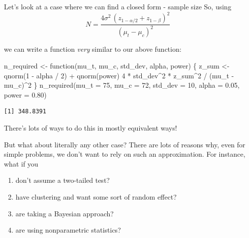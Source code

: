\documentclass[
  ignorenonframetext,
  aspectratio=169,
]{beamer}
\newenvironment{Shaded}{\begin{snugshade}}{\end{snugshade}}
\newcommand{\AttributeTok}[1]{\textcolor[rgb]{0.40,0.45,0.13}{#1}}
\newcommand{\ControlFlowTok}[1]{\textcolor[rgb]{0.00,0.23,0.31}{#1}}
\newcommand{\DecValTok}[1]{\textcolor[rgb]{0.68,0.00,0.00}{#1}}
\newcommand{\FloatTok}[1]{\textcolor[rgb]{0.68,0.00,0.00}{#1}}
\newcommand{\FunctionTok}[1]{\textcolor[rgb]{0.28,0.35,0.67}{#1}}
\newcommand{\NormalTok}[1]{\textcolor[rgb]{0.00,0.23,0.31}{#1}}
\newcommand{\OtherTok}[1]{\textcolor[rgb]{0.00,0.23,0.31}{#1}}
\newcommand{\SpecialCharTok}[1]{\textcolor[rgb]{0.37,0.37,0.37}{#1}}
\providecommand{\tightlist}{%
  \setlength{\itemsep}{0pt}\setlength{\parskip}{0pt}}\usepackage{longtable,booktabs,array}
\begin{document}
\begin{frame}[fragile]{Let's look at a case where we can find a closed
form - sample size}
\label{lets-look-at-a-case-where-we-can-find-a-closed-form---sample-size-2}
So, using \[
\boxed{N = \frac{4\sigma^2\,(z_{1-\alpha/2} + z_{1-\beta})^2}{(\mu_t - \mu_c)^2}}
\]

we can write a function \emph{very} similar to our above function:

\begin{Shaded}
\begin{Highlighting}[]
\NormalTok{n\_required }\OtherTok{\textless{}{-}} \ControlFlowTok{function}\NormalTok{(mu\_t, mu\_c, std\_dev, alpha, power) \{}
\NormalTok{  z\_sum }\OtherTok{\textless{}{-}} \FunctionTok{qnorm}\NormalTok{(}\DecValTok{1} \SpecialCharTok{{-}}\NormalTok{ alpha }\SpecialCharTok{/} \DecValTok{2}\NormalTok{) }\SpecialCharTok{+} \FunctionTok{qnorm}\NormalTok{(power)}
  \DecValTok{4} \SpecialCharTok{*}\NormalTok{ std\_dev}\SpecialCharTok{\^{}}\DecValTok{2} \SpecialCharTok{*}\NormalTok{ z\_sum}\SpecialCharTok{\^{}}\DecValTok{2} \SpecialCharTok{/}\NormalTok{ (mu\_t }\SpecialCharTok{{-}}\NormalTok{ mu\_c)}\SpecialCharTok{\^{}}\DecValTok{2}
\NormalTok{\}}
\FunctionTok{n\_required}\NormalTok{(}\AttributeTok{mu\_t =} \DecValTok{75}\NormalTok{, }\AttributeTok{mu\_c =} \DecValTok{72}\NormalTok{, }\AttributeTok{std\_dev =} \DecValTok{10}\NormalTok{, }\AttributeTok{alpha =} \FloatTok{0.05}\NormalTok{, }\AttributeTok{power =} \FloatTok{0.80}\NormalTok{)}
\end{Highlighting}
\end{Shaded}

\begin{verbatim}
[1] 348.8391
\end{verbatim}

There's lots of ways to do this in mostly equivalent ways!
\end{frame}

\begin{frame}{But what about literally any other case?}
\label{but-what-about-literally-any-other-case}
There are lots of reasons why, even for simple problems, we don't want
to rely on such an approximation. For instance, what if you

\begin{enumerate}
\tightlist
\item
  don't assume a two-tailed test?
\item
  have clustering and want some sort of random effect?
\item
  are taking a Bayesian approach?
\item
  are using nonparametric statistics?
\end{enumerate}
\end{frame}
\end{document}
